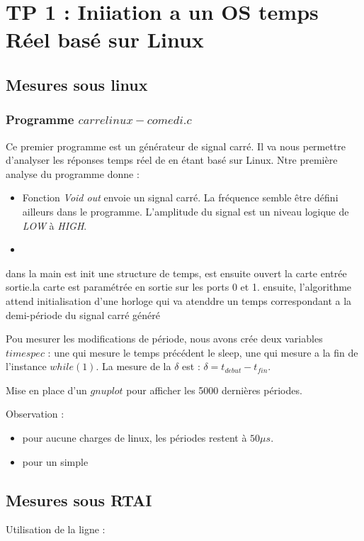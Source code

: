 \chapter{TP 1 : Iniiation a un OS temps Réel basé sur Linux}

\section{Mesures sous linux}
\subsection{Programme $carrelinux-comedi.c$}
Ce premier programme est un générateur de signal carré. Il va nous permettre d'analyser les réponses temps réel de en étant basé sur Linux. Ntre première analyse du programme donne :\begin{itemize}
\item Fonction \emph{Void out} envoie un signal carré. La fréquence semble être défini ailleurs dans le programme. L'amplitude du signal est un niveau logique de \emph{LOW} à \emph{HIGH}.
\item 
\end{itemize}

dans la main est init une structure de temps, est ensuite ouvert la carte entrée sortie.la carte est paramétrée en sortie sur les ports 0 et 1. 
ensuite, l'algorithme attend 
initialisation d'une horloge qui va atenddre un temps correspondant a la demi-période  du signal carré généré


Pou mesurer les modifications de période, nous avons crée deux variables $timespec$ : une qui mesure le temps précédent le sleep, une qui mesure a la fin de l'instance $while(1)$. La mesure de la $\delta$ est : $\delta = t_{debut} - t_{fin}$. 

Mise en place d'un $gnuplot$ pour afficher les 5000 dernières périodes. 

Observation : \begin{itemize}
\item pour aucune charges de linux, les périodes restent à $50\mu s$. 
\item pour un simple 
\end{itemize}

\section{Mesures sous RTAI}

Utilisation de la ligne : 



